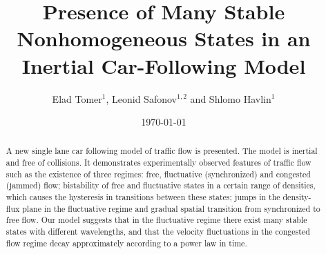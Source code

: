 

\newcommand\be{\begin{equation}}
\newcommand\en{\end{equation}}
\newcommand\bea{\begin{eqnarray}}
\newcommand\ena{\end{eqnarray}}



\draft

\title{Presence of Many Stable Nonhomogeneous States in  an Inertial Car-Following Model}

\author{Elad Tomer$^1$, Leonid Safonov$^{1,2}$ and Shlomo Havlin$^1$}
\address{$^1$ Minerva Center and Department of Physics,  Bar--Ilan~University,  52900~Ramat--Gan, Israel}
\address{$^2$ Department of Applied Mathematics and Mechanics, Voronezh State University, 394693~Voronezh, Russia}

\date{\today}

\maketitle

\begin{abstract}

A new single lane car following model of traffic flow is presented. The model
is inertial and free of collisions. It demonstrates experimentally observed
features of traffic flow such as the existence of three regimes: free,
fluctuative (synchronized) and congested (jammed) flow; bistability of free
and fluctuative states in a certain range of densities, which causes the
hysteresis in transitions between these states; jumps in the density-flux
plane in the fluctuative regime and gradual spatial transition from
synchronized to free flow. Our model suggests that in the fluctuative
regime there exist many stable states with different wavelengths, and that
the velocity fluctuations in the congested flow regime decay approximately
according to a power law in time.

\end{abstract}

\pacs{}

